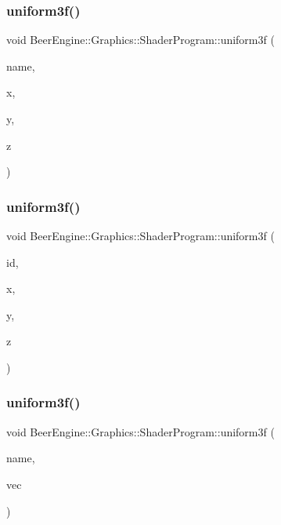 \subsubsection{\texorpdfstring{uniform3f()}{uniform3f()}\hspace{0.1cm}{\footnotesize\ttfamily [1/4]}}
{\footnotesize\ttfamily void Beer\+Engine\+::\+Graphics\+::\+Shader\+Program\+::uniform3f (\begin{DoxyParamCaption}\item[{std\+::string const \&}]{name,  }\item[{float}]{x,  }\item[{float}]{y,  }\item[{float}]{z }\end{DoxyParamCaption})}

\mbox{\label{class_beer_engine_1_1_graphics_1_1_shader_program_a3044bd52410d43c5ed58b5db0f84be13}} 
\subsubsection{\texorpdfstring{uniform3f()}{uniform3f()}\hspace{0.1cm}{\footnotesize\ttfamily [2/4]}}
{\footnotesize\ttfamily void Beer\+Engine\+::\+Graphics\+::\+Shader\+Program\+::uniform3f (\begin{DoxyParamCaption}\item[{G\+Lint}]{id,  }\item[{float}]{x,  }\item[{float}]{y,  }\item[{float}]{z }\end{DoxyParamCaption})}

\mbox{\label{class_beer_engine_1_1_graphics_1_1_shader_program_aff28ec6e574385d817a03435aec393c2}} 
\subsubsection{\texorpdfstring{uniform3f()}{uniform3f()}\hspace{0.1cm}{\footnotesize\ttfamily [3/4]}}
{\footnotesize\ttfamily void Beer\+Engine\+::\+Graphics\+::\+Shader\+Program\+::uniform3f (\begin{DoxyParamCaption}\item[{std\+::string const \&}]{name,  }\item[{glm\+::vec3 const \&}]{vec }\end{DoxyParamCaption})}

